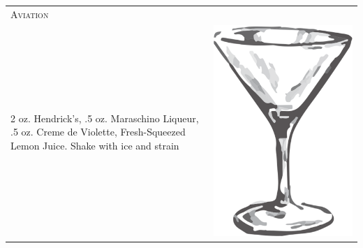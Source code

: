 \documentclass{article}
\begin{document}
\begin{tabular}{p{2in} p{0.5in}}
\multicolumn{2}{p{3in}}{\centering\Huge\textsc{Aviation}}\\ 
  \vspace{-0.1in} 2 oz. Hendrick's, .5 oz. Maraschino Liqueur, .5 oz. Creme de Violette, Fresh-Squeezed Lemon Juice. Shake with ice and strain &
  \vspace{-0.1in} \includegraphics{goblet.png}
\end{tabular}
\end{document}
